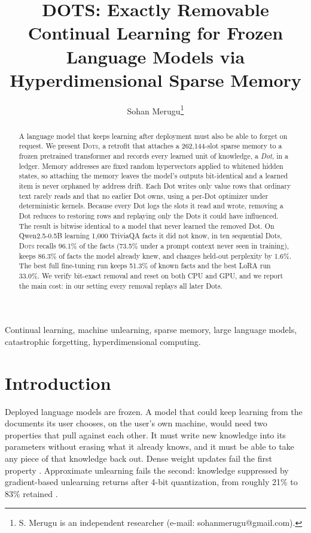 \documentclass[journal]{IEEEtran}
\newcommand{\sys}{\textsc{Dots}}
\let\citep\cite \let\citet\cite
\begin{document}
\title{DOTS: Exactly Removable Continual Learning for Frozen Language Models via Hyperdimensional Sparse Memory}
\author{Sohan Merugu\thanks{S. Merugu is an independent researcher (e-mail: sohanmerugu@gmail.com).}}
\maketitle
\begin{abstract}
A language model that keeps learning after deployment must also be able to forget on request. We present \sys{}, a retrofit that attaches a 262{,}144-slot sparse memory to a frozen pretrained transformer and records every learned unit of knowledge, a \emph{Dot}, in a ledger. Memory addresses are fixed random hypervectors applied to whitened hidden states, so attaching the memory leaves the model's outputs bit-identical and a learned item is never orphaned by address drift. Each Dot writes only value rows that ordinary text rarely reads and that no earlier Dot owns, using a per-Dot optimizer under deterministic kernels. Because every Dot logs the slots it read and wrote, removing a Dot reduces to restoring rows and replaying only the Dots it could have influenced. The result is bitwise identical to a model that never learned the removed Dot. On Qwen2.5-0.5B learning 1{,}000 TriviaQA facts it did not know, in ten sequential Dots, \sys{} recalls 96.1\% of the facts (73.5\% under a prompt context never seen in training), keeps 86.3\% of facts the model already knew, and changes held-out perplexity by 1.6\%. The best full fine-tuning run keeps 51.3\% of known facts and the best LoRA run 33.0\%. We verify bit-exact removal and reset on both CPU and GPU, and we report the main cost: in our setting every removal replays all later Dots.
\end{abstract}
\begin{IEEEkeywords}
Continual learning, machine unlearning, sparse memory, large language models, catastrophic forgetting, hyperdimensional computing.
\end{IEEEkeywords}


\section{Introduction}

Deployed language models are frozen. A model that could keep learning from the documents its user chooses, on the user's own machine, would need two properties that pull against each other. It must write new knowledge into its parameters without erasing what it already knows, and it must be able to take any piece of that knowledge back out. Dense weight updates fail the first property \citep{mccloskey1989,kirkpatrick2017ewc,ibrahim2024simple}. Approximate unlearning fails the second: knowledge suppressed by gradient-based unlearning returns after 4-bit quantization, from roughly 21\% to 83\% retained \citep{zhang2025quant}.
\end{document}
